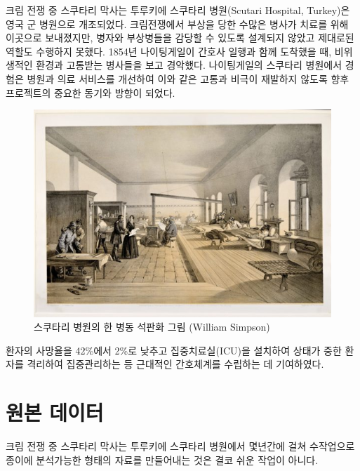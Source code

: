 \documentclass[
  letterpaper,
  chapter,a4paper,showtrims,openright,hidelinks]{oblivoir}
\begin{document}
크림 전쟁 중 스쿠타리 막사는 투루키에 스쿠타리 병원(Scutari Hospital,
Turkey)은 영국 군 병원으로 개조되었다. 크림전쟁에서 부상을 당한 수많은
병사가 치료를 위해 이곳으로 보내졌지만, 병자와 부상병들을 감당할 수
있도록 설계되지 않았고 제대로된 역할도 수행하지 못했다. 1854년
나이팅게일이 간호사 일행과 함께 도착했을 때, 비위생적인 환경과 고통받는
병사들을 보고 경악했다. 나이팅게일의 스쿠타리 병원에서 경험은 병원과
의료 서비스를 개선하여 이와 같은 고통과 비극이 재발하지 않도록 향후
프로젝트의 중요한 동기와 방향이 되었다.

\begin{figure}

{\centering \includegraphics{images/scutari.jpg}

}

\caption{스쿠타리 병원의 한 병동 석판화 그림 (William Simpson)}

\end{figure}

환자의 사망율을 42\%에서 2\%로 낮추고 집중치료실(ICU)을 설치하여 상태가
중한 환자를 격리하여 집중관리하는 등 근대적인 간호체계를 수립하는 데
기여하였다.

\hypertarget{uxc6d0uxbcf8-uxb370uxc774uxd130}{%
\section{원본 데이터}\label{uxc6d0uxbcf8-uxb370uxc774uxd130}}

크림 전쟁 중 스쿠타리 막사는 투루키에 스쿠타리 병원에서 몇년간에 걸쳐
수작업으로 종이에 분석가능한 형태의 자료를 만들어내는 것은 결코 쉬운
작업이 아니다.
\end{document}
